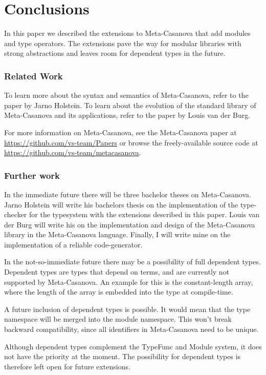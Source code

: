 \section{Conclusions}
In this paper we described the extensions to Meta-Casanova that add modules and type operators.
The extensions pave the way for modular libraries with strong abstractions and leaves room for dependent types in the future.

\subsubsection*{Related Work}
To learn more about the syntax and semantics of Meta-Casanova, refer to the paper by Jarno Holstein\cite{holstein16}.
To learn about the evolution of the standard library of Meta-Casanova and its applications, refer to the paper by Louis van der Burg\cite{vanderburg16}.

For more information on Meta-Casanova, see the Meta-Casanova paper at \url{https://github.com/vs-team/Papers} or browse the freely-available source code at \url{https://github.com/vs-team/metacasanova}.

\subsubsection*{Further work}
In the immediate future there will be three bachelor theses on Meta-Casanova.
Jarno Holstein will write his bachelors thesis on the implementation of the type-checker for the typesystem with the extensions described in this paper.
Louis van der Burg will write his on the implementation and design of the Meta-Casanova library in the Meta-Casanova language.
Finally, I will write mine on the implementation of a reliable code-generator.

In the not-so-immediate future there may be a possibility of full dependent types.
Dependent types are types that depend on terms, and are currently not supported by Meta-Casanova.
An example for this is the constant-length array, where the length of the array is embedded into the type at compile-time.

A future inclusion of dependent types is possible.
It would mean that the type namespace will be merged into the module namespace.
This won't break backward compatibility, since all identifiers in Meta-Casanova need to be unique.

Although dependent types complement the TypeFunc and Module system, it does not have the priority at the moment.
The possibility for dependent types is therefore left open for future extensions.
